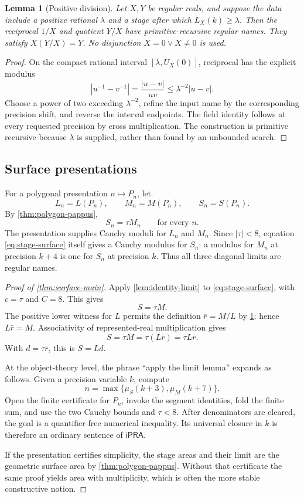 \documentclass[11pt]{article}
\newtheorem{lemma}[theorem]{Lemma}
\theoremstyle{definition}
\newcommand{\ipra}{\mathsf{iPRA}}
\newcommand{\abs}[1]{\left|#1\right|}
\begin{document}
\begin{lemma}[Positive division]
\label{lem:positive-division}
Let $X,Y$ be regular reals, and suppose the data include a positive rational
$\lambda$ and a stage after which $L_X(k)\geq\lambda$.  Then the reciprocal
$1/X$ and quotient $Y/X$ have primitive-recursive regular names.  They satisfy
$X(Y/X)=Y$.  No disjunction $X=0\vee X\neq0$ is used.
\end{lemma}

\begin{proof}
On the compact rational interval $[\lambda,U_X(0)]$, reciprocal has the
explicit modulus
\[
 \abs{u^{-1}-v^{-1}}=\frac{\abs{u-v}}{uv}
 \leq\lambda^{-2}\abs{u-v}.
\]
Choose a power of two exceeding $\lambda^{-2}$, refine the input name by the
corresponding precision shift, and reverse the interval endpoints.  The field
identity follows at every requested precision by cross multiplication.  The
construction is primitive recursive because $\lambda$ is supplied, rather
than found by an unbounded search.
\end{proof}

\subsection{Surface presentations}

For a polygonal presentation $n\mapsto P_n$, let
\[
 L_n=L(P_n),\qquad M_n=M(P_n),\qquad S_n=S(P_n).
\]
By \cref{thm:polygon-pappus},
\begin{equation}
 S_n=\tau M_n
 \qquad\text{for every }n.
 \label{eq:stage-surface}
\end{equation}
The presentation supplies Cauchy moduli for $L_n$ and $M_n$.  Since
$\abs\tau<8$, equation \eqref{eq:stage-surface} itself gives a Cauchy modulus
for $S_n$: a modulus for $M_n$ at precision $k+4$ is one for $S_n$ at
precision $k$.  Thus all three diagonal limits are regular names.

\begin{proof}[Proof of \cref{thm:surface-main}]
Apply \cref{lem:identity-limit} to \eqref{eq:stage-surface}, with $c=\tau$ and
$C=8$.  This gives
\[
 S=\tau M.
\]
The positive lower witness for $L$ permits the definition
$\bar r=M/L$ by \cref{lem:positive-division}; hence $L\bar r=M$.  Associativity
of represented-real multiplication gives
\[
 S=\tau M=\tau(L\bar r)=\tau L\bar r.
\]
With $d=\tau\bar r$, this is $S=Ld$.

At the object-theory level, the phrase ``apply the limit lemma'' expands as
follows.  Given a precision variable $k$, compute
\[
 n=\max\{\mu_S(k+3),\mu_M(k+7)\}.
\]
Open the finite certificate for $P_n$, invoke the segment identities, fold the
finite sum, and use the two Cauchy bounds and $\tau<8$.  After denominators are
cleared, the goal is a quantifier-free numerical inequality.  Its universal
closure in $k$ is therefore an ordinary sentence of $\ipra$.

If the presentation certifies simplicity, the stage areas and their limit are
the geometric surface area by \cref{thm:polygon-pappus}.  Without that
certificate the same proof yields area with multiplicity, which is often the
more stable constructive notion.
\end{proof}
\end{document}

